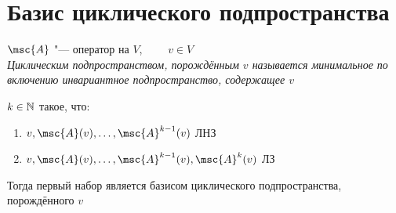 \section{Базис циклического подпространства}

\begin{definition}
	$ \msc{A} $ "--- оператор на $ V $, $ \qquad v \in V $ \\
	\it{Циклическим подпространством}, порождённым $ v $ называется минимальное по включению инвариантное подпространство, содержащее $ v $
\end{definition}

\begin{theorem}
	$ k \in \mathbb{N} $ такое, что:
	\begin{enumerate}
		\item $ v, \msc{A}(v), \dots, \msc{A}^{k - 1}(v) $ ЛНЗ
		\item $ v, \msc{A}(v), \dots, \msc{A}^{k - 1}(v), \msc{A}^k(v) $ ЛЗ
	\end{enumerate}
	Тогда первый набор является базисом циклического подпространства, порождённого $ v $
\end{theorem}


